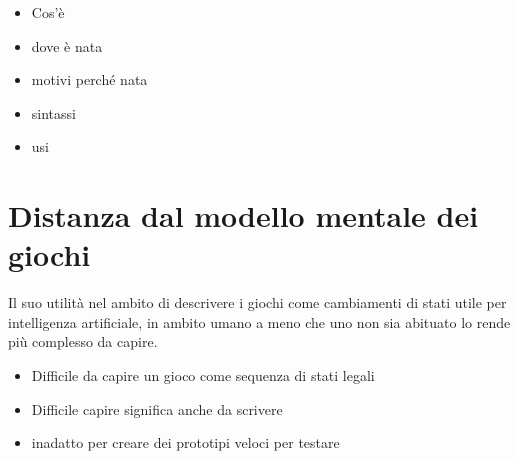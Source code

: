 \begin{itemize}
    \item Cos'è 
    \item dove è nata
    \item motivi perché nata
    \item sintassi
    \item usi
\end{itemize}

\section{Distanza dal modello mentale dei giochi}
Il suo utilità nel ambito di descrivere i giochi come cambiamenti di stati 
utile per intelligenza artificiale, in ambito umano a meno che uno non sia 
abituato lo rende più complesso da capire. 

\begin{itemize}
    \item Difficile da capire un gioco come sequenza di stati legali
    \item Difficile capire significa anche da scrivere
    \item inadatto per creare dei prototipi veloci per testare 
\end{itemize}